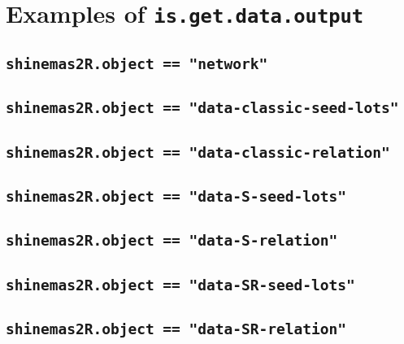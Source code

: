 \section{Examples of \texttt{is.get.data.output}}
\label{examples_is_get_data_output}

\subsection{\texttt{shinemas2R.object == "network"}}

\subsection{\texttt{shinemas2R.object == "data-classic-seed-lots"}}

\subsection{\texttt{shinemas2R.object == "data-classic-relation"}}

\subsection{\texttt{shinemas2R.object == "data-S-seed-lots"}}

\subsection{\texttt{shinemas2R.object == "data-S-relation"}}

\subsection{\texttt{shinemas2R.object == "data-SR-seed-lots"}}

\subsection{\texttt{shinemas2R.object == "data-SR-relation"}}
